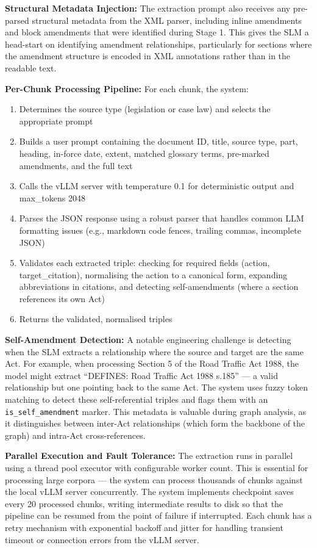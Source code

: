 \documentclass[10pt, a4paper, twocolumn]{article}
\begin{document}
\textbf{Structural Metadata Injection:} The extraction prompt also receives any pre-parsed structural metadata from the XML parser, including inline amendments and block amendments that were identified during Stage 1. This gives the SLM a head-start on identifying amendment relationships, particularly for sections where the amendment structure is encoded in XML annotations rather than in the readable text.

\textbf{Per-Chunk Processing Pipeline:} For each chunk, the system:
\begin{enumerate}
    \item Determines the source type (legislation or case law) and selects the appropriate prompt
    \item Builds a user prompt containing the document ID, title, source type, part, heading, in-force date, extent, matched glossary terms, pre-marked amendments, and the full text
    \item Calls the vLLM server with temperature 0.1 for deterministic output and max\_tokens 2048
    \item Parses the JSON response using a robust parser that handles common LLM formatting issues (e.g., markdown code fences, trailing commas, incomplete JSON)
    \item Validates each extracted triple: checking for required fields (action, target\_citation), normalising the action to a canonical form, expanding abbreviations in citations, and detecting self-amendments (where a section references its own Act)
    \item Returns the validated, normalised triples
\end{enumerate}

\textbf{Self-Amendment Detection:} A notable engineering challenge is detecting when the SLM extracts a relationship where the source and target are the same Act. For example, when processing Section 5 of the Road Traffic Act 1988, the model might extract ``DEFINES: Road Traffic Act 1988 s.185'' — a valid relationship but one pointing back to the same Act. The system uses fuzzy token matching to detect these self-referential triples and flags them with an \texttt{is\_self\_amendment} marker. This metadata is valuable during graph analysis, as it distinguishes between inter-Act relationships (which form the backbone of the graph) and intra-Act cross-references.

\textbf{Parallel Execution and Fault Tolerance:} The extraction runs in parallel using a thread pool executor with configurable worker count. This is essential for processing large corpora — the system can process thousands of chunks against the local vLLM server concurrently. The system implements checkpoint saves every 20 processed chunks, writing intermediate results to disk so that the pipeline can be resumed from the point of failure if interrupted. Each chunk has a retry mechanism with exponential backoff and jitter for handling transient timeout or connection errors from the vLLM server.
\end{document}
